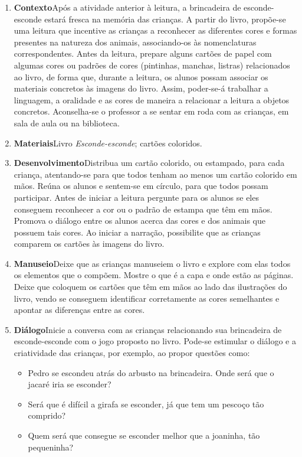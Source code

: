 \documentclass[11pt]{extarticle}
\begin{document}
\begin{enumerate}
\item \textbf{Contexto}\quad Após a atividade anterior à leitura, a brincadeira de esconde-esconde estará fresca na memória das crianças. A partir do livro, propõe-se uma leitura que incentive as crianças a reconhecer as diferentes cores e formas presentes na natureza dos animais, associando-os às nomenclaturas correspondentes. 
Antes da leitura, prepare alguns cartões de papel com algumas cores ou padrões de cores (pintinhas, manchas, listras) relacionados ao livro, de forma que, durante a leitura, os alunos possam associar os materiais concretos às imagens do livro.
Assim, poder-se-á trabalhar a linguagem, a oralidade e as cores de maneira a relacionar a leitura a objetos concretos. 
Aconselha-se o professor a se sentar em roda com as crianças, em sala de aula ou na biblioteca.

\item \textbf{Materiais}\quad Livro \textit{Esconde-esconde}; cartões coloridos.


\item \textbf{Desenvolvimento}\quad Distribua um cartão colorido, ou estampado, para cada criança, atentando-se para que todos tenham ao menos um cartão colorido em mãos. Reúna os alunos e sentem-se em círculo, para que todos possam participar. Antes de iniciar a leitura pergunte para os alunos se eles conseguem reconhecer a cor ou o padrão de estampa que têm em mãos. Promova o diálogo entre os alunos acerca das cores e dos animais que possuem tais cores. Ao iniciar a narração, possibilite que as crianças comparem os cartões às imagens do livro.
 
\item \textbf{Manuseio}\quad Deixe que as crianças manuseiem o livro 
e explore com elas todos os elementos que o compõem. Mostre o que é a 
capa e onde estão as páginas. Deixe que coloquem os cartões que têm em mãos ao lado das ilustrações do livro, vendo se conseguem identificar corretamente as cores semelhantes e apontar as diferenças entre as cores.

\item \textbf{Diálogo}\quad Inicie a conversa com as crianças relacionando sua brincadeira de esconde-esconde com o jogo proposto no livro. Pode-se estimular o diálogo e a criatividade das crianças, por exemplo, ao propor questões como:

\begin{itemize}
\item Pedro se escondeu atrás do arbusto na brincadeira. Onde será que o jacaré iria se esconder?
\item Será que é difícil a girafa se esconder, já que tem um pescoço tão comprido?
\item Quem será que consegue se esconder melhor que a joaninha, tão pequeninha?
\end{itemize}


\end{enumerate}
\end{document}
